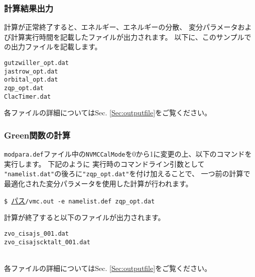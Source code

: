 \subsubsection{計算結果出力}
計算が正常終了すると、エネルギー、エネルギーの分散、
変分パラメータおよび計算実行時間を記載したファイルが出力されます。
以下に、このサンプルでの出力ファイルを記載します。\\
\begin{minipage}{12cm}
\begin{screen}
\begin{verbatim}
gutzwiller_opt.dat
jastrow_opt.dat
orbital_opt.dat
zqp_opt.dat
ClacTimer.dat
\end{verbatim}
\end{screen}
\end{minipage}

各ファイルの詳細についてはSec. \ref{Sec:outputfile}をご覧ください。

\subsubsection{Green関数の計算}

\verb|modpara.def|ファイル中の\verb|NVMCCalMode|を0から1に変更の上、以下のコマンドを実行します。
下記のように
実行時のコマンドライン引数として
\verb|"namelist.dat"|の後ろに\verb|"zqp_opt.dat"|を付け加えることで、
一つ前の計算で最適化された変分パラメータを使用した計算が行われます。

\vspace{1cm}\hspace{-0.7cm}
\verb|$ |\underline{パス}\verb|/vmc.out -e namelist.def zqp_opt.dat|
\small

計算が終了すると以下のファイルが出力されます。
\\
\begin{minipage}{12cm}
\begin{screen}
\begin{verbatim}
zvo_cisajs_001.dat
zvo_cisajscktalt_001.dat
\end{verbatim}
\end{screen}
\end{minipage}
\\
各ファイルの詳細についてはSec. \ref{Sec:outputfile}をご覧ください。

